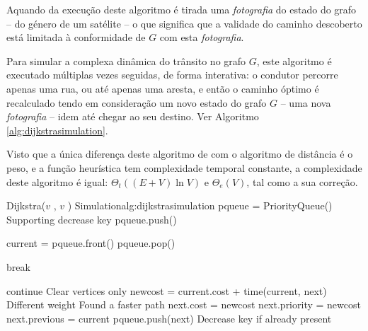 \documentclass[relatorio.tex]{subfiles}
\begin{document}
Aquando da execução deste algoritmo é tirada uma \emph{fotografia} do estado do grafo
-- do género de um satélite -- o que significa que a validade do caminho descoberto
está limitada à conformidade de $G$ com esta \emph{fotografia}.

Para simular a complexa dinâmica do trânsito no grafo $G$, este algoritmo é
executado múltiplas vezes seguidas, de forma interativa: o condutor percorre apenas
uma rua, ou até apenas uma aresta, e então o caminho óptimo é recalculado tendo em
consideração um novo estado do grafo $G$ -- uma nova \emph{fotografia} -- idem
até chegar ao seu destino. Ver Algoritmo \ref{alg:dijkstrasimulation}.

Visto que a única diferença deste algoritmo de  com o algoritmo
de distância é o peso, e a função heurística tem complexidade temporal constante,
a complexidade deste algoritmo é igual: $\Theta_t((E+V)\ln V)$ e $\Theta_e(V)$, tal
como a sua correção.

\begin{algor}{Dijkstra($v$ , $v$ ) \Comment Simulation}{alg:dijkstrasimulation}
\State pqueue = PriorityQueue() \Comment Supporting decrease key
\State pqueue.push()

    \State current = pqueue.front()
    \State pqueue.pop()

        \State break
    \EndIf

            \State continue \Comment Clear vertices only
        \EndIf
        \State newcost = current.cost + time(current, next) \Comment Different weight
         \Comment Found a faster path
            \State next.cost = newcost
            \State next.priority = newcost
            \State next.previous = current
            \State pqueue.push(next) \Comment Decrease key if already present
        \EndIf
    \EndFor
\EndWhile
\end{algor}
\end{document}

